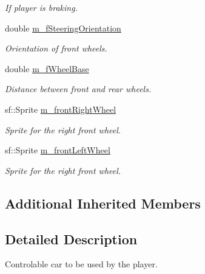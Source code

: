 \begin{DoxyCompactItemize}
\begin{DoxyCompactList}\small\item\em If player is braking. \end{DoxyCompactList}\item 
\hypertarget{class_car_af67de6d3bb5203272670314409bd3ca8}{}double \hyperlink{class_car_af67de6d3bb5203272670314409bd3ca8}{m\+\_\+f\+Steering\+Orientation}\label{class_car_af67de6d3bb5203272670314409bd3ca8}

\begin{DoxyCompactList}\small\item\em Orientation of front wheels. \end{DoxyCompactList}\item 
\hypertarget{class_car_a7be779b298ee9803e8189e08f0cafc27}{}double \hyperlink{class_car_a7be779b298ee9803e8189e08f0cafc27}{m\+\_\+f\+Wheel\+Base}\label{class_car_a7be779b298ee9803e8189e08f0cafc27}

\begin{DoxyCompactList}\small\item\em Distance between front and rear wheels. \end{DoxyCompactList}\item 
\hypertarget{class_car_aea62fd9764bf52faf154681914343316}{}sf\+::\+Sprite \hyperlink{class_car_aea62fd9764bf52faf154681914343316}{m\+\_\+front\+Right\+Wheel}\label{class_car_aea62fd9764bf52faf154681914343316}

\begin{DoxyCompactList}\small\item\em Sprite for the right front wheel. \end{DoxyCompactList}\item 
\hypertarget{class_car_a17f7c49c8c95c1d6c238d48e6500ed52}{}sf\+::\+Sprite \hyperlink{class_car_a17f7c49c8c95c1d6c238d48e6500ed52}{m\+\_\+front\+Left\+Wheel}\label{class_car_a17f7c49c8c95c1d6c238d48e6500ed52}

\begin{DoxyCompactList}\small\item\em Sprite for the right front wheel. \end{DoxyCompactList}\end{DoxyCompactItemize}
\subsection*{Additional Inherited Members}


\subsection{Detailed Description}
Controlable car to be used by the player. 

